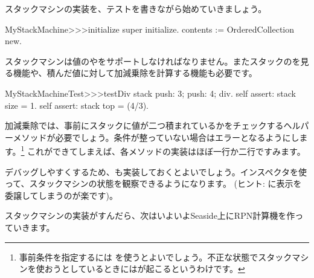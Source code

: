 \documentclass[a4paper,10pt,twoside]{book}
\begin{document}
スタックマシンの実装を、テストを書きながら始めていきましょう。


\begin{code}{}
MyStackMachine>>>initialize
	super initialize.
	contents := OrderedCollection new.
\end{code}

スタックマシンは値のやをサポートしなければなりません。またスタックのを見る機能や、積んだ値に対して加減乗除を計算する機能も必要です。


\begin{code}{}
MyStackMachineTest>>>testDiv
	stack
		push: 3;
		push: 4;
		div.
	self assert: stack size = 1.
	self assert: stack top = (4/3).
\end{code}

加減乗除では、事前にスタックに値が二つ積まれているかをチェックするヘルパーメソッドが必要でしょう。条件が整っていない場合はエラーとなるようにします。\footnote{事前条件を指定するには  を使うとよいでしょう。不正な状態でスタックマシンを使おうとしているときにはが起こるというわけです。}
これができてしまえば、各メソッドの実装はほぼ一行か二行ですみます。

デバッグしやすくするため、も実装しておくとよいでしょう。インスペクタを使って、スタックマシンの状態を観察できるようになります。
(ヒント:  に表示を委譲してしまうのが楽です)。


スタックマシンの実装がすんだら、次はいよいよSeaside上にRPN計算機を作っていきます。
\end{document}
